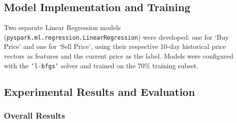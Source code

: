 \subsection{Model Implementation and Training}
\label{subsec:model-implementation-and-training}

Two separate Linear Regression models (\texttt{pyspark.ml.regression.LinearRegression}) were developed: one for `Buy Price' and one for `Sell Price', using their respective 10-day historical price vectors as features and the current price as the label.
Models were configured with the \texttt{`l-bfgs'} solver and trained on the 70\% training subset.

\subsection{Experimental Results and Evaluation}
\label{subsec:experimental-results-and-evaluation}

\subsubsection{Overall Results}\text{}

\begin{table}[h]
    \centering
    \caption{LR Performance Metrics for Gold Price Prediction.}
    \renewcommand{\arraystretch}{1} %
    \label{tab:task2_metrics}
\end{table}

